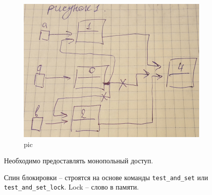 \begin{figure}[H]
  \centering
  \includegraphics[width=\textwidth]{pic/1.png}
  \caption{pic}
\end{figure}

Необходимо предоставлять монопольный доступ.

Спин блокировки – строятся на основе команды \verb|test_and_set| или \verb|test_and_set_lock|. Lock – слово в памяти.




